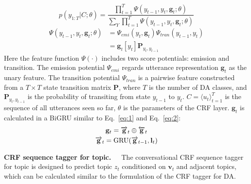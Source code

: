 \documentclass[11pt,a4paper]{article}
\begin{document}
\begin{equation}
    p\left( y _ { 1 : T} | C ; \theta \right) =
\frac { \prod _ { t = 1 } ^ { T } \Psi \left( y _ { t - 1 } , y _ { t } , \mathbf{g} _ { t } ; \theta \right) } { \sum _ { Y } \prod _ { t = 1 } ^ { T } \Psi \left( y _ { t - 1 } , y _ { t } , \mathbf{g} _ { t } ; \theta \right) }
\end{equation}
\begin{equation}
    \begin{split}
        \Psi \left( y _ { t - 1 } , y _ { t } , \mathbf{g} _ { t } ; \theta \right) &= \Psi _ {emi} \left( y _ { t },\mathbf{g} _ { t } \right) \Psi_{tran} \left( y _ { t - 1 },y _ { t } \right)\\
&= \mathbf{g} _ { t } \left[ y _ { t } \right] \mathbf {P} _ { y _ { t } , y _ { t - 1 } }
    \end{split}
\end{equation}
Here the feature function $\Psi(\cdot)$ includes two score potentials: emission and transition. The emission potential $\Psi_ {emi}$ regards utterance representation $\mathbf{g}_t$ as the unary feature. The transition potential $\Psi_{tran}$ is a pairwise feature constructed from a $T \times T$ state transition matrix $\mathbf {P}$, where $T$ is the number of DA classes, and  $\mathbf {P}_{y_{t}, y_{t-1}}$ is the probability of transiting from state $y_{t-1}$ to $y_{t}$.  $C = \langle u_{t} \rangle_{t=1}^T$ is the sequence of all utterances seen so far, $\theta$ is the parameters of the CRF layer. $\mathbf{g}_t$ is calculated in a BiGRU similar to Eq.~\ref{eq:1} and Eq.~\ref{eq:2}:
\begin{gather} \label{eq:8}
\mathbf { g }_t = {  \overrightarrow { \mathbf { g } } _ t \oplus \overleftarrow  { \mathbf { g } } _ t }\\\overrightarrow { \mathbf { g } } _ t = \mathop{\rm GRU} (\overrightarrow { \mathbf { g } } _ {t-1},\mathbf{l} _ t)\end{gather}


\noindent\textbf{CRF sequence tagger for topic.}~~~The conversational CRF sequence tagger for topic is designed to predict topic $z_t$ conditioned on $\mathbf{v}_t$ and adjacent topics, which can be calculated similar to the formulation of the CRF tagger for DA.
\end{document}
